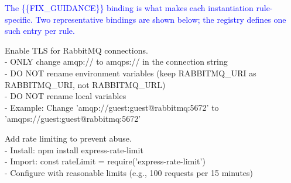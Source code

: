 \documentclass[preprint,12pt]{elsarticle}
\newcommand{\new}[1]{\textcolor{blue}{#1}}
\begin{document}
\new{The \{\{FIX\_GUIDANCE\}\} binding is what makes each instantiation
rule-specific. Two representative bindings are shown below; the registry
defines one such entry per rule.}

\begin{tcolorbox}[
    colback=gray!5!white,
    colframe=gray!75!black,
    title=\{\{FIX\_GUIDANCE\}\} bound for RULE\_ID = PLAINTEXT\_BROKER,
    fonttitle=\bfseries
]
\small\ttfamily
Enable TLS for RabbitMQ connections.\\
- ONLY change amqp:// to amqps:// in the connection string\\
- DO NOT rename environment variables (keep RABBITMQ\_URI as\\
\hspace*{1em}RABBITMQ\_URI, not RABBITMQ\_URL)\\
- DO NOT rename local variables\\
- Example: Change 'amqp://guest:guest@rabbitmq:5672' to\\
\hspace*{1em}'amqps://guest:guest@rabbitmq:5672'
\end{tcolorbox}

\begin{tcolorbox}[
    colback=gray!5!white,
    colframe=gray!75!black,
    title=\{\{FIX\_GUIDANCE\}\} bound for RULE\_ID = MISSING\_RATE\_LIMITING,
    fonttitle=\bfseries
]
\small\ttfamily
Add rate limiting to prevent abuse.\\
- Install: npm install express-rate-limit\\
- Import: const rateLimit = require('express-rate-limit')\\
- Configure with reasonable limits (e.g., 100 requests per 15 minutes)
\end{tcolorbox}
\end{document}

